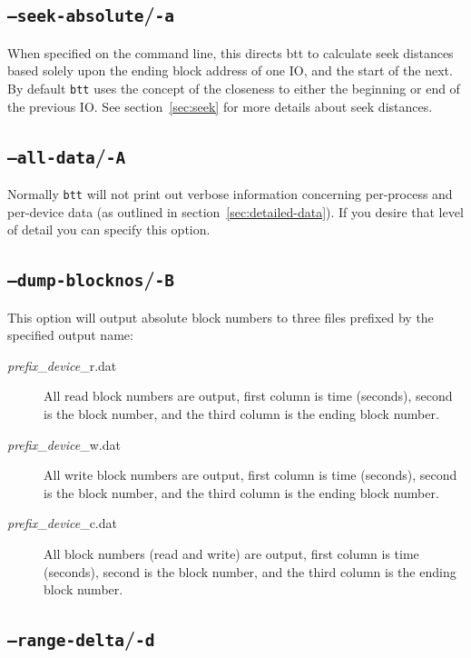 \documentclass{article}
\begin{document}
\subsection{\label{sec:o-a}\texttt{--seek-absolute}/\texttt{-a}}

  When specified on the command line, this directs btt to calculate
  seek distances based solely upon the ending block address of one IO,
  and the start of the next.  By default \texttt{btt} uses the concept
  of the closeness to either the beginning or end of the previous IO. See
  section~\ref{sec:seek} for more details about seek distances.

\subsection{\label{sec:o-A}\texttt{--all-data}/\texttt{-A}}

  Normally \texttt{btt} will not print out verbose information
  concerning per-process and per-device data (as outlined in
  section~\ref{sec:detailed-data}). If you desire that level of 
  detail you can specify this option.

\subsection{\label{sec:o-B}\texttt{--dump-blocknos}/\texttt{-B}}

  This option will output absolute block numbers to three files prefixed
  by the specified output name:

  \begin{description}
    \item[\emph{prefix}\_\emph{device}\_r.dat] All read block numbers are
    output, first column is time (seconds), second is the block number,
    and the third column is the ending block number.

    \item[\emph{prefix}\_\emph{device}\_w.dat] All write block numbers are
    output, first column is time (seconds), second is the block number,
    and the third column is the ending block number.

    \item[\emph{prefix}\_\emph{device}\_c.dat] All block numbers (read
    and write) are output, first column is time (seconds), second is
    the block number, and the third column is the ending block number.
  \end{description}

\subsection{\label{sec:o-d}\texttt{--range-delta}/\texttt{-d}}
\end{document}
